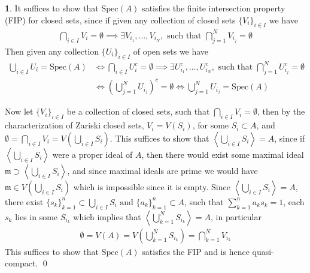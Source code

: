 \documentclass[11pt]{article}
\theoremstyle{definition}
\newtheorem{pb}{}
\newcommand{\set}[1]{\{#1\}}
\newcommand{\gen}[1]{\left\langle #1 \right\rangle}
\newcommand{\tand}{\text{ and }}
\newcommand{\spec}{\text{Spec}}
\begin{document}
    \begin{pb}
        It suffices to show that \(\spec(A)\) satisfies the finite intersection property (FIP) for closed sets, since if given any collection of closed sets \(\set{V_i}_{i \in I}\) we have
        \begin{align*}
            \bigcap_{i \in I}V_i = \emptyset \implies \exists V_{i_1},\hdots,V_{i_N}, \text{ such that } \bigcap_{j=1}^N V_{i_j} = \emptyset
        \end{align*}
        Then given any collection \(\set{U_i}_{i \in I}\) of open sets we have
        \begin{align*}
            \bigcup_{i \in I}U_i = \spec(A) &\iff \bigcap_{i \in I}U_i^c = \emptyset \implies \exists U_{i_1}^c,\hdots,U_{i_N}^c, \text{ such that } \bigcap_{j=1}^N U_{i_j}^c = \emptyset \\
            &\iff \left(\bigcup_{j=1}^N U_{i_j}\right)^c = \emptyset \iff \bigcup_{j=1}^N U_{i_j} = \spec(A)
        \end{align*}
        
        Now let \(\set{V_i}_{i \in I}\) be a collection of closed sets, such that \(\bigcap_{i \in I}V_i = \emptyset\), then by the characterization of Zariski closed sets, \(V_i = V(S_i)\), for some \(S_i \subset A\), and \(\emptyset = \bigcap_{i \in I}V_i = V(\bigcup_{i \in I}S_i)\). This suffices to show that \(\gen{\bigcup_{i \in I}S_i} = A\), since if \(\gen{\bigcup_{i \in I}S_i}\) were a proper ideal of \(A\), then there would exist some maximal ideal \(\mathfrak{m} \supset \gen{\bigcup_{i \in I}S_i}\), and since maximal ideals are prime we would have \(\mathfrak{m} \in V(\bigcup_{i \in I} S_i)\) which is impossible since it is empty. Since \(\gen{\bigcup_{i \in I}S_i} = A\), there exist \(\set{s_k}_{k=1}^n \subset \bigcup_{i \in I}S_i \tand \set{a_k}_{k=1}^n \subset A\), such that \(\sum_{k=1}^n a_ks_k = 1\), each \(s_k\) lies in some \(S_{i_k}\) which implies that \(\gen{\bigcup_{k=1}^N S_{i_k}} = A\), in particular
        \begin{align*}
            \emptyset = V(A) = V\left(\bigcup_{k=1}^N S_{i_k}\right) = \bigcap_{k=1}^N V_{i_k}
        \end{align*}
        This suffices to show that \(\spec(A)\) satisfies the FIP and is hence quasi-compact. \qed
    \end{pb}
\end{document}
